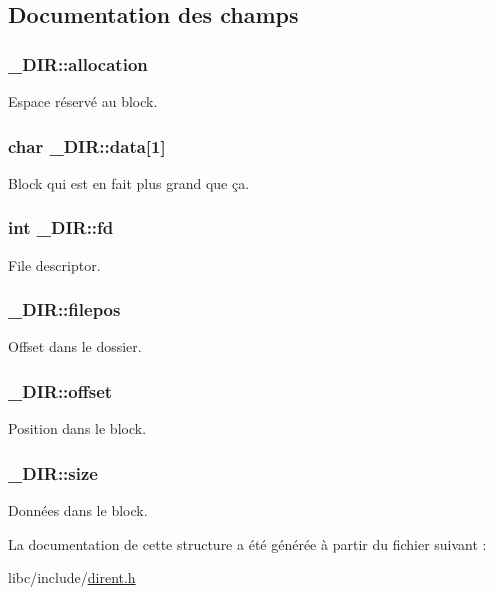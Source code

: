 \subsection{\-Documentation des champs}
\hypertarget{struct__DIR_a395fdd86b324fd71725a24e4f6edd55c}{
\subsubsection[{allocation}]{ {\bf \-\_\-\-D\-I\-R\-::allocation}}}\label{struct__DIR_a395fdd86b324fd71725a24e4f6edd55c}
\-Espace réservé au block. \hypertarget{struct__DIR_a87bb023e0bf0b2f075e90d270ff7033e}{
\subsubsection[{data}]{\setlength{\rightskip}{0pt plus 5cm}char {\bf \-\_\-\-D\-I\-R\-::data}\mbox{[}1\mbox{]}}}\label{struct__DIR_a87bb023e0bf0b2f075e90d270ff7033e}
\-Block qui est en fait plus grand que ça. \hypertarget{struct__DIR_a1ee17b3cb06ddc80fb648e65c8353c55}{
\subsubsection[{fd}]{\setlength{\rightskip}{0pt plus 5cm}int {\bf \-\_\-\-D\-I\-R\-::fd}}}\label{struct__DIR_a1ee17b3cb06ddc80fb648e65c8353c55}
\-File descriptor. \hypertarget{struct__DIR_a759e6f1c2754b12a4aba9d120f3d1e57}{
\subsubsection[{filepos}]{ {\bf \-\_\-\-D\-I\-R\-::filepos}}}\label{struct__DIR_a759e6f1c2754b12a4aba9d120f3d1e57}
\-Offset dans le dossier. \hypertarget{struct__DIR_a298b074b577743d5c726b4fdc2917795}{
\subsubsection[{offset}]{ {\bf \-\_\-\-D\-I\-R\-::offset}}}\label{struct__DIR_a298b074b577743d5c726b4fdc2917795}
\-Position dans le block. \hypertarget{struct__DIR_a117676c5eb31163a8b99520bd2cbf1aa}{
\subsubsection[{size}]{ {\bf \-\_\-\-D\-I\-R\-::size}}}\label{struct__DIR_a117676c5eb31163a8b99520bd2cbf1aa}
\-Données dans le block. 

\-La documentation de cette structure a été générée à partir du fichier suivant \-:\begin{DoxyCompactItemize}
\item 
libc/include/\hyperlink{dirent_8h}{dirent.\-h}\end{DoxyCompactItemize}
